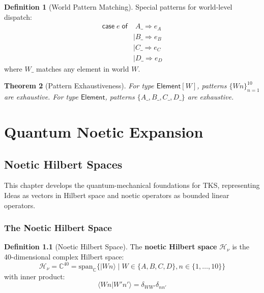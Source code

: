\documentclass[11pt,twoside,openright]{book}
\theoremstyle{definition}
\newtheorem{definition}{Definition}[chapter]
\theoremstyle{plain}
\newtheorem{theorem}[definition]{Theorem}
\theoremstyle{remark}
\newcommand{\Hspace}{\mathcal{H}}
\newcommand{\qket}[1]{|#1\rangle}
\newcommand{\qbraket}[2]{\langle #1 | #2 \rangle}
\newcommand{\vnewtwo}{\textbf{v7.2 New}}
\begin{document}
\begin{definition}[World Pattern Matching]
\label{def:world-pattern}
Special patterns for world-level dispatch:
\begin{align}
\mathsf{case}\; e\; \mathsf{of} &\; A\_ \Rightarrow e_A \\
    &\mid B\_ \Rightarrow e_B \\
    &\mid C\_ \Rightarrow e_C \\
    &\mid D\_ \Rightarrow e_D
\end{align}
where $W\_$ matches any element in world $W$.
\end{definition}

\begin{theorem}[Pattern Exhaustiveness]
\label{thm:exhaustiveness}
For type $\mathsf{Element}[W]$, patterns $\{Wn\}_{n=1}^{10}$ are exhaustive. For type $\mathsf{Element}$, patterns $\{A\_, B\_, C\_, D\_\}$ are exhaustive.
\end{theorem}

\part{Quantum Noetic Expansion}

\chapter{Noetic Hilbert Spaces}
\label{ch:noetic-hilbert}

\begin{tcolorbox}[colback=blue!5!white,colframe=blue!75!black,title=\vnewtwo]
This chapter develops the quantum-mechanical foundations for TKS, representing Ideas as vectors in Hilbert space and noetic operators as bounded linear operators.
\end{tcolorbox}

\section{The Noetic Hilbert Space}

\begin{definition}[Noetic Hilbert Space]
\label{def:noetic-hilbert}
The \textbf{noetic Hilbert space} $\Hspace_\nu$ is the 40-dimensional complex Hilbert space:
\[
\Hspace_\nu = \mathbb{C}^{40} = \mathrm{span}_\mathbb{C}\{\qket{Wn} \mid W \in \{A,B,C,D\}, n \in \{1,\ldots,10\}\}
\]
with inner product:
\[
\qbraket{Wn}{W'n'} = \delta_{WW'} \delta_{nn'}
\]
\end{definition}
\end{document}
